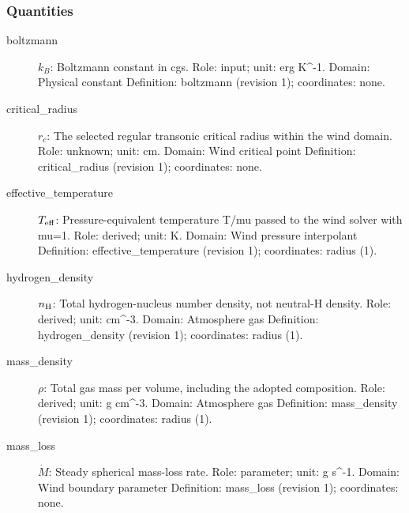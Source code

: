 \subsubsection*{Quantities}
\begin{description}
\item[boltzmann] $k_B$: Boltzmann constant in cgs.
\newline Role: input; unit: erg K\textasciicircum{}-1.
\newline Domain: Physical constant
\newline Definition: boltzmann (revision 1); coordinates: none.
\item[critical\_radius] $r_c$: The selected regular transonic critical radius within the wind domain.
\newline Role: unknown; unit: cm.
\newline Domain: Wind critical point
\newline Definition: critical\_radius (revision 1); coordinates: none.
\item[effective\_temperature] $T_{\rm eff}$: Pressure-equivalent temperature T/mu passed to the wind solver with mu=1.
\newline Role: derived; unit: K.
\newline Domain: Wind pressure interpolant
\newline Definition: effective\_temperature (revision 1); coordinates: radius (1).
\item[hydrogen\_density] $n_{\rm H}$: Total hydrogen-nucleus number density, not neutral-H density.
\newline Role: derived; unit: cm\textasciicircum{}-3.
\newline Domain: Atmosphere gas
\newline Definition: hydrogen\_density (revision 1); coordinates: radius (1).
\item[mass\_density] $\rho$: Total gas mass per volume, including the adopted composition.
\newline Role: derived; unit: g cm\textasciicircum{}-3.
\newline Domain: Atmosphere gas
\newline Definition: mass\_density (revision 1); coordinates: radius (1).
\item[mass\_loss] $\dot M$: Steady spherical mass-loss rate.
\newline Role: parameter; unit: g s\textasciicircum{}-1.
\newline Domain: Wind boundary parameter
\newline Definition: mass\_loss (revision 1); coordinates: none.

\end{description}
